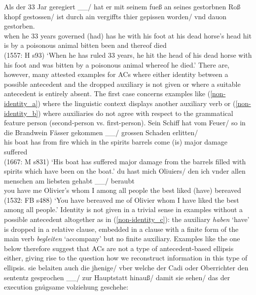 \documentclass[output=paper,colorlinks,citecolor=brown]{langscibook}
\begin{document}
\ea \label{identity}
\gll Als der 33 Jar geregiert \_\_/ hat er mit seinem fueß an seines gestorbnen Roß khopf gestossen/ ist durch ain vergiffts thier gepissen worden/ vnd dauon gestorben. \\ when he 33 years governed (had) has he with his foot at his dead horse's head hit is by a poisonous animal bitten been and thereof died  \\  \hfill (1557: H s93)
\glt `When he has ruled 33 years, he hit the head of his dead horse with his foot and was bitten by a poisonous animal whereof he died.'
\z
There are, however, many attested examples for ACs where either identity between a possible antecedent and the dropped auxiliary is not given or where a suitable antecedent is entirely absent. The first case concerns examples like (\ref{non-identity_a}) where the linguistic context displays another auxiliary verb or (\ref{non-identity_b}) where auxiliaries do not agree with respect to the grammatical feature person (second-person vs. first-person). 
\eal
\ex \label{non-identity_a}
\gll Sein Schiff hat vom Feuer/ so in die Brandwein Fässer gekommen \_\_/ grossen Schaden erlitten/ \\ his boat has from fire which in the spirits barrels come (is) major damage suffered \\ \hfill (1667: M s831)
\glt `His boat has suffered major damage from the barrels filled with spirits which have been on the boat.'
\ex \label{non-identity_b}
\gll du hast mich Oliuiers/ den ich vnder allen menschen am liebsten gehabt \_\_/ beraubt \\ you have me Olivier's whom I among all people the best liked (have) bereaved \\ \hfill (1532: FB s488) 
\glt `You have bereaved me of Olivier whom I have liked the best among all people.'
\zl
Identity is not given in a trivial sense in examples without a possible antecedent altogether as in (\ref{non-identity_c}): the auxiliary \textit{haben} `have' is dropped in a relative clause, embedded in a clause with a finite form of the main verb \textit{begleiten} `accompany' but no finite auxiliary. Examples like the one below therefore suggest that ACs are not a type of antecedent-based ellipsis either, giving rise to the question how we reconstruct information in this type of ellipsis.
\ea \label{non-identity_c}
\gll sie belaiten auch {die jhenige}/ vber welche der Cadi oder Oberrichter den sententz gesprochen
\_\_/ zur Hauptstatt hinauß/ damit sie sehen/ das der execution gn\r{u}gsame volziehung geschehe: \\
\end{document}
